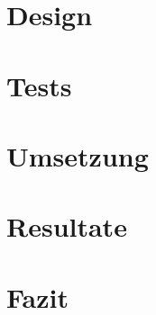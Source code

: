 \documentclass[
11pt, %
a4paper, %
BCOR10mm, %
DIV14, %
footsepline = false, %
headsepline, %
oneside, %
openright,
halfparskip, %
abstracton, %
listof=totocnumbered, %
bibliography=totocnumbered %
]{scrreprt}
\begin{document}
  \chapter{Design}
  \label{cha:Design}
  
  
  \chapter{Tests}
  \label{cha:Tests}
  
  
  \chapter{Umsetzung}
  \label{cha:Umsetzung}
  

  \chapter{Resultate}
  \label{cha:Resultate}
  

  \chapter{Fazit}
  \label{cha:Fazit}
  
  
  \appendix  
  \listoffigures
  \listoftables
  \lstlistoflistings
  
  \glsaddall
  \printglossaries
  
  \nocite{*}
  
  
\end{document}
